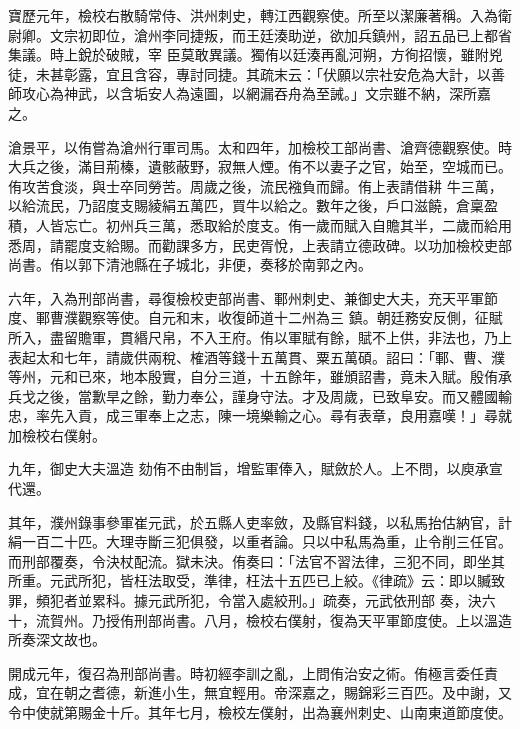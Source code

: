 \begin{pinyinscope}
 寶歷元年，檢校右散騎常侍、洪州刺史，轉江西觀察使。所至以潔廉著稱。入為衛尉卿。文宗初即位，滄州李同捷叛，而王廷湊助逆，欲加兵鎮州，詔五品已上都省集議。時上銳於破賊，宰
 臣莫敢異議。獨侑以廷湊再亂河朔，方徇招懷，雖附兇徒，未甚彰露，宜且含容，專討同捷。其疏末云：「伏願以宗社安危為大計，以善師攻心為神武，以含垢安人為遠圖，以網漏吞舟為至誡。」文宗雖不納，深所嘉之。



 滄景平，以侑嘗為滄州行軍司馬。太和四年，加檢校工部尚書、滄齊德觀察使。時大兵之後，滿目荊榛，遺骸蔽野，寂無人煙。侑不以妻子之官，始至，空城而已。侑攻苦食淡，與士卒同勞苦。周歲之後，流民襁負而歸。侑上表請借耕
 牛三萬，以給流民，乃詔度支賜綾絹五萬匹，買牛以給之。數年之後，戶口滋饒，倉稟盈積，人皆忘亡。初州兵三萬，悉取給於度支。侑一歲而賦入自贍其半，二歲而給用悉周，請罷度支給賜。而勸課多方，民吏胥悅，上表請立德政碑。以功加檢校吏部尚書。侑以郭下清池縣在子城北，非便，奏移於南郭之內。



 六年，入為刑部尚書，尋復檢校吏部尚書、鄆州刺史、兼御史大夫，充天平軍節度、鄆曹濮觀察等使。自元和末，收復師道十二州為三
 鎮。朝廷務安反側，征賦所入，盡留贍軍，貫緡尺帛，不入王府。侑以軍賦有餘，賦不上供，非法也，乃上表起太和七年，請歲供兩稅、榷酒等錢十五萬貫、粟五萬碩。詔曰：「鄆、曹、濮等州，元和已來，地本殷實，自分三道，十五餘年，雖頒詔書，竟未入賦。殷侑承兵戈之後，當歉旱之餘，勤力奉公，謹身守法。才及周歲，已致阜安。而又體國輸忠，率先入貢，成三軍奉上之志，陳一境樂輸之心。尋有表章，良用嘉嘆！」尋就加檢校右僕射。



 九年，御史大夫溫造
 劾侑不由制旨，增監軍俸入，賦斂於人。上不問，以庾承宣代還。



 其年，濮州錄事參軍崔元武，於五縣人吏率斂，及縣官料錢，以私馬抬估納官，計絹一百二十匹。大理寺斷三犯俱發，以重者論。只以中私馬為重，止令削三任官。而刑部覆奏，令決杖配流。獄未決。侑奏曰：「法官不習法律，三犯不同，即坐其所重。元武所犯，皆枉法取受，準律，枉法十五匹已上絞。《律疏》云：即以贓致罪，頻犯者並累科。據元武所犯，令當入處絞刑。」疏奏，元武依刑部
 奏，決六十，流賀州。乃授侑刑部尚書。八月，檢校右僕射，復為天平軍節度使。上以溫造所奏深文故也。



 開成元年，復召為刑部尚書。時初經李訓之亂，上問侑治安之術。侑極言委任責成，宜在朝之耆德，新進小生，無宜輕用。帝深嘉之，賜錦彩三百匹。及中謝，又令中使就第賜金十斤。其年七月，檢校左僕射，出為襄州刺史、山南東道節度使。




\end{pinyinscope}

